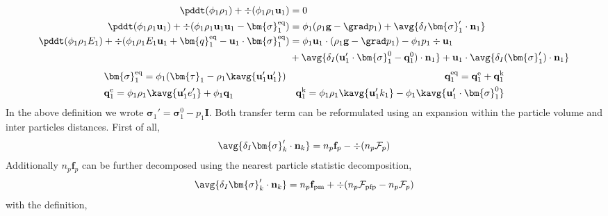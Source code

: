 \begin{align}
    \label{eq:dt_&vg_rho}
    \pddt (\phi_1 \rho_1)  
    + \div (
        \phi_1 \rho_1\textbf{u}_1
    )
    &= 
    0\\
    \label{eq:dt_&vg_rhou_1}
    \pddt (\phi_1 \rho_1\textbf{u}_1)  
    + \div (
        \phi_1 \rho_1\textbf{u}_1\textbf{u}_1
        - \bm{\sigma}_1^\text{eq}
    )
    &= 
    \phi_1  (\rho_1\textbf{g} - \grad p_1 )
    +  \avg{\delta_I \bm{\sigma}_1' \cdot \textbf{n}_1}\\
    \label{eq:dt_&vg_rhoE_1}
    \pddt (\phi_1\rho_1E_1)  
    + \div (
        \phi_1\rho_1E_1\textbf{u}_1
        + \bm{q}_1^\text{eq}
        - \textbf{u}_1 \cdot \bm{\sigma}_1^\text{eq}
        )
    &= 
    \phi_1 \textbf{u}_1 \cdot (\rho_1\textbf{g}
    - \grad p_1 
    )
    - \phi_1 p_1 \div \textbf{u}_1\\
    &+ \avg{\delta_I (\textbf{u}_1' \cdot \bm{\sigma}_1^0 
    - \textbf{q}_1^0)\cdot \textbf{n}_1}
    + \textbf{u}_1 \cdot \avg{\delta_I ( \bm{\sigma}_1')\cdot \textbf{n}_1}
\end{align} 
\begin{align*}
    &\bm{\sigma}_1^\text{eq}
    = \phi_1 (
        \bm{\tau}_1%
        - \rho_1\kavg{\textbf{u}_1'\textbf{u}_1'})  
    &\textbf{q}_1^\text{eq}
    =\textbf{q}_1^\text{e} 
    +\textbf{q}_1^\text{k}  \\
    &\textbf{q}_1^\text{e}
    = \phi_1\rho_1 \kavg{\textbf{u}_1' e_1'} 
    + \phi_1\textbf{q}_1 
    &\textbf{q}_1^\text{k}
    = \phi_1\rho_1 \kavg{\textbf{u}_1' k_1} 
    - \phi_1\kavg{\textbf{u}_1' \cdot \bm{\sigma}_1^0}
\end{align*}
In the above definition we wrote $\bm{\sigma}_1' =\bm{\sigma}_1^0 - p_1 \textbf{I}$. 
Both transfer term can be reformulated using an expansion within the particle volume and inter particles distances. 
First of all, 
\begin{align*}
    \avg{\delta_I \bm{\sigma}_k' \cdot \textbf{n}_k}
    = n_p \textbf{f}_p - \div (n_p \mathcal{F}_p)
\end{align*}
Additionally $n_p \textbf{f}_p$ can be further decomposed using the nearest particle statistic decomposition, 
\begin{align*}
    \avg{\delta_I \bm{\sigma}_k' \cdot \textbf{n}_k}
    = n_p \textbf{f}_\text{pm} + \div (n_p \mathcal{F}_\text{pfp} - n_p \mathcal{F}_p)
\end{align*}
with the definition,
